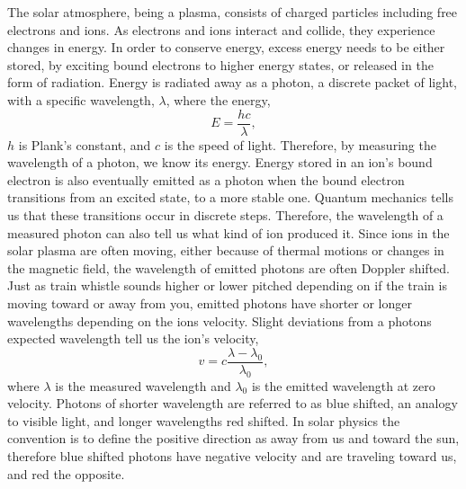 The solar atmosphere, being a plasma, consists of charged particles including free electrons and ions.
As electrons and ions interact and collide, they experience changes in energy. 
In order to conserve energy, excess energy needs to be either stored, by exciting bound electrons to higher energy states, or released in the form of radiation.
Energy is radiated away as a photon, a discrete packet of light, with a specific wavelength, $\lambda$, where the energy,
\begin{equation}
	E = \frac{hc}{\lambda},
\end{equation}
$h$ is Plank's constant, and $c$ is the speed of light.
Therefore, by measuring the wavelength of a photon, we know its energy.
Energy stored in an ion's bound electron is also eventually emitted as a photon when the bound electron transitions from an excited state, to a more stable one.
Quantum mechanics tells us that these transitions occur in discrete steps.
Therefore, the wavelength of a measured photon can also tell us what kind of ion produced it.
Since ions in the solar plasma are often moving, either because of thermal motions or changes in the magnetic field, the wavelength of emitted photons are often Doppler shifted.  
Just as train whistle sounds higher or lower pitched depending on if the train is moving toward or away from you, emitted photons have shorter or longer wavelengths depending on the ions velocity.
Slight deviations from a photons expected wavelength tell us the ion's velocity,
\begin{equation}
	v = c \frac{\lambda - \lambda_0}{\lambda_0},
\end{equation}
where $\lambda$ is the measured wavelength and $\lambda_0$ is the emitted wavelength at zero velocity.
Photons of shorter wavelength are referred to as blue shifted, an analogy to visible light, and longer wavelengths red shifted.
In solar physics the convention is to define the positive direction as away from us and toward the sun, therefore blue shifted photons have negative velocity and are traveling toward us, and red the opposite.

